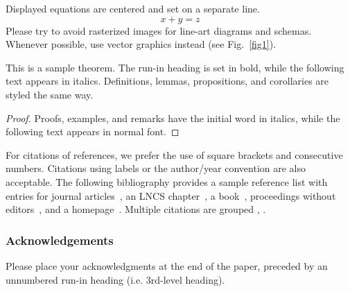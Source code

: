\documentclass[runningheads]{llncs}
\begin{document}
\noindent Displayed equations are centered and set on a separate
line.
\begin{equation}
x + y = z
\end{equation}
Please try to avoid rasterized images for line-art diagrams and
schemas. Whenever possible, use vector graphics instead (see
Fig.~\ref{fig1}).


\begin{theorem}
This is a sample theorem. The run-in heading is set in bold, while
the following text appears in italics. Definitions, lemmas,
propositions, and corollaries are styled the same way.
\end{theorem}
%
%
\begin{proof}
Proofs, examples, and remarks have the initial word in italics,
while the following text appears in normal font.
\end{proof}
For citations of references, we prefer the use of square brackets
and consecutive numbers. Citations using labels or the author/year
convention are also acceptable. The following bibliography provides
a sample reference list with entries for journal
articles~\cite{ref_article1}, an LNCS chapter~\cite{abhijith2020impact}, a
book~\cite{ref_book1}, proceedings without editors~\cite{ref_proc1},
and a homepage~\cite{ref_url1}. Multiple citations are grouped
\cite{ref_article1,ref_lncs1,ref_book1},
\cite{ref_article1,ref_book1,ref_proc1,ref_url1}.

\subsubsection{Acknowledgements} Please place your acknowledgments at
the end of the paper, preceded by an unnumbered run-in heading (i.e.
3rd-level heading).

%
%
%


\end{document}
